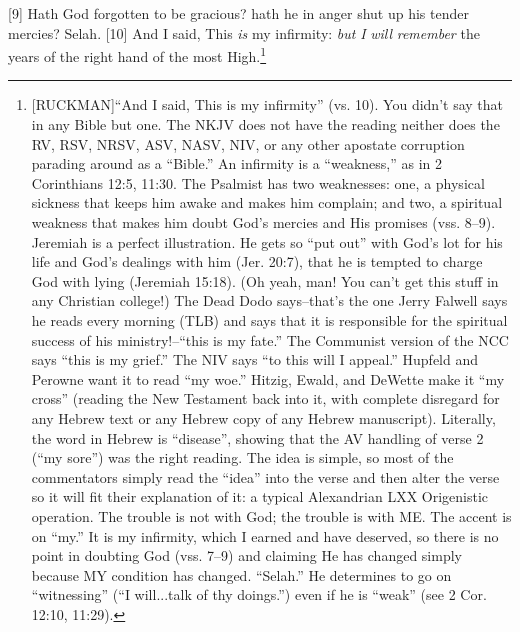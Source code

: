 [9] \textcolor[rgb]{0.00,0.00,1.00}{Hath God forgotten to be gracious? hath he in anger shut up his tender mercies? Selah.}
[10] \textcolor[rgb]{0.00,0.00,1.00}{And I said, This \emph{is} my infirmity: \emph{but} \emph{I} \emph{will} \emph{remember} the years of the right hand of the most High.}\footnote{[RUCKMAN]``And I said, This is my infirmity” (vs. 10). You didn’t say that in any Bible but one. The NKJV does not have the reading neither does the RV, RSV, NRSV, ASV, NASV, NIV, or any other apostate corruption parading around as a “Bible.” An infirmity is a “weakness,” as in 2 Corinthians 12:5, 11:30. The Psalmist has two weaknesses: one, a physical sickness that keeps him awake and makes him complain; and two, a spiritual weakness that makes him doubt God’s mercies and His promises (vss. 8--9). Jeremiah is a perfect illustration. He gets so “put out” with God’s lot for his life and God’s dealings with him (Jer. 20:7), that he is tempted to charge God with lying (Jeremiah 15:18). (Oh yeah, man! You can’t get this stuff in any Christian college!) The Dead Dodo says--that’s the one Jerry Falwell says he reads every morning (TLB) and says that it is responsible for the spiritual success of his ministry!--“this is my fate.” The Communist version of the NCC says “this is my grief.” The NIV says ``to this will I appeal.'' Hupfeld and Perowne want it to read “my woe.” Hitzig, Ewald, and DeWette make it “my cross” (reading the New Testament back into it, with complete disregard for any Hebrew text or any Hebrew copy of any Hebrew manuscript). Literally, the word in Hebrew is “disease”, showing that the AV handling of verse 2 (“my sore”) was the right reading. The idea is simple, so most of the commentators simply read the “idea” into the verse and then alter the verse so it will fit their explanation of it: a typical Alexandrian LXX Origenistic operation. The trouble is not with God; the trouble is with ME. The accent is on “my.” It is my infirmity, which I earned and have deserved, so there is no point in doubting God (vss. 7--9) and claiming He has changed simply because MY condition has changed. “Selah.” He determines to go on “witnessing” (“I will...talk of thy doings.”) even if he is “weak” (see 2 Cor. 12:10, 11:29).\cite{Ruckman1992Psalms}}
